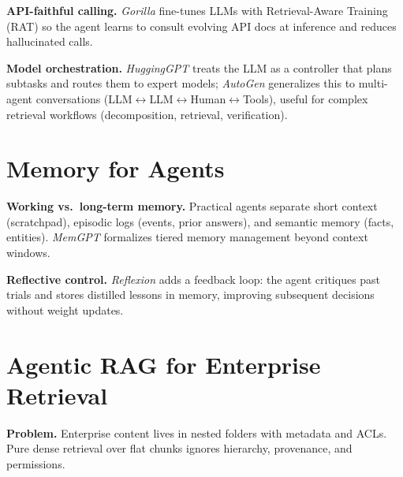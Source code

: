 \textbf{API-faithful calling.} \emph{Gorilla} fine-tunes LLMs with Retrieval-Aware Training (RAT) so the agent learns to consult evolving API docs at inference and reduces hallucinated calls.

\textbf{Model orchestration.} \emph{HuggingGPT} treats the LLM as a controller that plans subtasks and routes them to expert models; \emph{AutoGen} generalizes this to multi-agent conversations (LLM$\leftrightarrow$LLM$\leftrightarrow$Human$\leftrightarrow$Tools), useful for complex retrieval workflows (decomposition, retrieval, verification).

\section{Memory for Agents}
\textbf{Working vs.\ long-term memory.} Practical agents separate short context (scratchpad), episodic logs (events, prior answers), and semantic memory (facts, entities). \emph{MemGPT} formalizes tiered memory management beyond context windows.

\textbf{Reflective control.} \emph{Reflexion} adds a feedback loop: the agent critiques past trials and stores distilled lessons in memory, improving subsequent decisions without weight updates.

\section{Agentic RAG for Enterprise Retrieval}
\textbf{Problem.} Enterprise content lives in nested folders with metadata and ACLs. Pure dense retrieval over flat chunks ignores hierarchy, provenance, and permissions.

